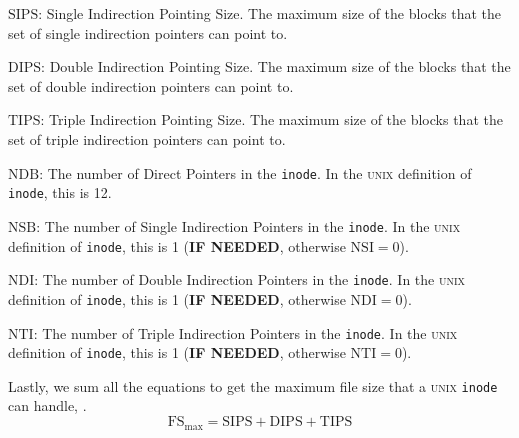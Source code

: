 \begin{description}[noitemsep]
\item $\mathrm{SIPS}$: Single Indirection Pointing Size.
  The maximum size of the blocks that the set of single indirection pointers can point to.
\item $\mathrm{DIPS}$: Double Indirection Pointing Size.
  The maximum size of the blocks that the set of double indirection pointers can point to.
\item $\mathrm{TIPS}$: Triple Indirection Pointing Size.
  The maximum size of the blocks that the set of triple indirection pointers can point to.
\item $\mathrm{NDB}$: The number of Direct Pointers in the \texttt{inode}.
  In the \textsc{unix} definition of \texttt{inode}, this is 12.
\item $\mathrm{NSB}$: The number of Single Indirection Pointers in the \texttt{inode}.
  In the \textsc{unix} definition of \texttt{inode}, this is 1 (\textbf{IF NEEDED}, otherwise $\mathrm{NSI} = 0$).
\item $\mathrm{NDI}$: The number of Double Indirection Pointers in the \texttt{inode}.
  In the \textsc{unix} definition of \texttt{inode}, this is 1 (\textbf{IF NEEDED}, otherwise $\mathrm{NDI} = 0$).
\item $\mathrm{NTI}$: The number of Triple Indirection Pointers in the \texttt{inode}.
  In the \textsc{unix} definition of \texttt{inode}, this is 1 (\textbf{IF NEEDED}, otherwise $\mathrm{NTI} = 0$).
\end{description}

Lastly, we sum all the equations  to get the maximum file size that a \textsc{unix} \texttt{inode} can handle, .
\begin{equation}\label{eq:Inode_Max_File_Size}
  \mathrm{FS}_{\max} = \mathrm{SIPS} + \mathrm{DIPS} + \mathrm{TIPS}
\end{equation}


